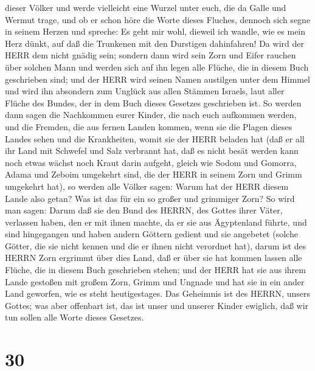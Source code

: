 dieser Völker und werde vielleicht eine Wurzel unter euch, die da Galle
und Wermut trage,  und ob er schon höre die Worte dieses
Fluches, dennoch sich segne in seinem Herzen und spreche: Es geht mir
wohl, dieweil ich wandle, wie es mein Herz dünkt, auf daß die Trunkenen
mit den Durstigen dahinfahren!  Da wird der HERR dem nicht
gnädig sein; sondern dann wird sein Zorn und Eifer rauchen über solchen
Mann und werden sich auf ihn legen alle Flüche, die in diesem Buch
geschrieben sind; und der HERR wird seinen Namen austilgen unter dem
Himmel  und wird ihn absondern zum Unglück aus allen
Stämmen Israels, laut aller Flüche des Bundes, der in dem Buch dieses
Gesetzes geschrieben ist.  So werden dann sagen die
Nachkommen eurer Kinder, die nach euch aufkommen werden, und die
Fremden, die aus fernen Landen kommen, wenn sie die Plagen dieses Landes
sehen und die Krankheiten, womit sie der HERR beladen hat 
(daß er all ihr Land mit Schwefel und Salz verbrannt hat, daß es nicht
besät werden kann noch etwas wächst noch Kraut darin aufgeht, gleich wie
Sodom und Gomorra, Adama und Zeboim umgekehrt sind, die der HERR in
seinem Zorn und Grimm umgekehrt hat),  so werden alle
Völker sagen: Warum hat der HERR diesem Lande also getan? Was ist das
für ein so großer und grimmiger Zorn?  So wird man sagen:
Darum daß sie den Bund des HERRN, des Gottes ihrer Väter, verlassen
haben, den er mit ihnen machte, da er sie aus Ägyptenland führte,
 und sind hingegangen und haben andern Göttern gedient und
sie angebetet (solche Götter, die sie nicht kennen und die er ihnen
nicht verordnet hat),  darum ist des HERRN Zorn ergrimmt
über dies Land, daß er über sie hat kommen lassen alle Flüche, die in
diesem Buch geschrieben stehen;  und der HERR hat sie aus
ihrem Lande gestoßen mit großem Zorn, Grimm und Ungnade und hat sie in
ein ander Land geworfen, wie es steht heutigestages.  Das
Geheimnis ist des HERRN, unsers Gottes; was aber offenbart ist, das ist
unser und unserer Kinder ewiglich, daß wir tun sollen alle Worte dieses
Gesetzes.

\hypertarget{section-29}{%
\section{30}\label{section-29}}

